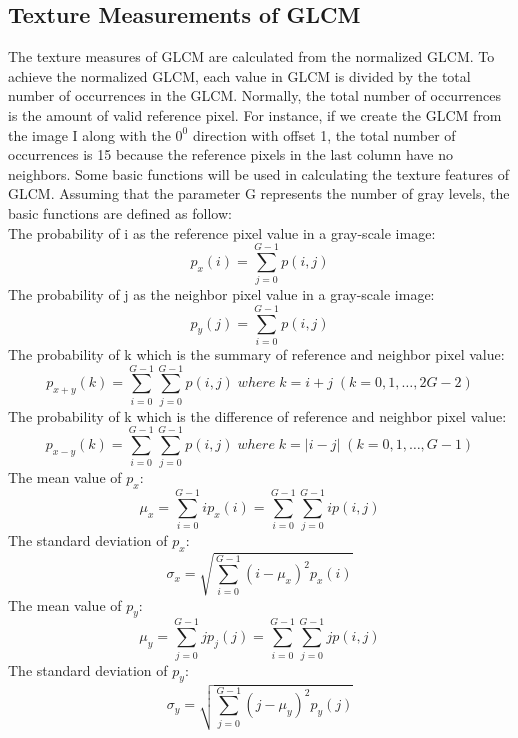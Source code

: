 \subsection{Texture Measurements of GLCM}
The texture measures of GLCM are calculated from the normalized GLCM. To achieve the normalized GLCM, each value in GLCM is divided by the total number of occurrences in the GLCM. Normally, the total number of occurrences is the amount of valid reference pixel. For instance, if we create the GLCM from the image I along with the $0^0$ direction with offset 1, the total number of occurrences is 15 because the reference pixels in the last column have no neighbors. Some basic functions will be used in calculating the texture features of GLCM\cite{Haralick}. Assuming that the parameter G represents the number of gray levels, the basic functions are defined as follow:\\
The probability of i as the reference pixel value in a gray-scale image:
\begin{equation}
    p_x(i) = \sum_{j=0}^{G-1}p(i,j) 
\end{equation}
The probability of j as the neighbor pixel value in a gray-scale image:
\begin{equation}
    p_y(j) = \sum_{i=0}^{G-1}p(i,j)
\end{equation}
The probability of k which is the summary of reference and neighbor pixel value:
\begin{equation}
    p_{x+y}(k) = \sum_{i=0}^{G-1}\sum_{j=0}^{G-1} p(i,j) \; where\; k = i + j\;(k=0,1,\ldots,2G-2)
\end{equation}
The probability of k which is the difference of reference and neighbor pixel value:
\begin{equation}
    p_{x-y}(k) = \sum_{i=0}^{G-1}\sum_{j=0}^{G-1} p(i,j) \; where\; k = |i - j|\;(k=0,1,\ldots,G-1)
\end{equation}
The mean value of $p_x$:
\begin{equation}
\mu_x = \sum_{i=0}^{G-1}ip_x(i)=\sum_{i=0}^{G-1}\sum_{j=0}^{G-1} ip(i,j)
\end{equation}
The standard deviation of $p_x$:
\begin{equation}
\sigma_x = \sqrt{\sum_{i=0}^{G-1}(i-\mu_x)^2p_x(i)}
\end{equation}
The mean value of $p_y$:
\begin{equation}
\mu_y = \sum_{j=0}^{G-1}jp_j(j)=\sum_{i=0}^{G-1}\sum_{j=0}^{G-1} jp(i,j)
\end{equation}
The standard deviation of $p_y$:
\begin{equation}
\sigma_y = \sqrt{\sum_{j=0}^{G-1}(j-\mu_y)^2p_y(j)}
\end{equation}
